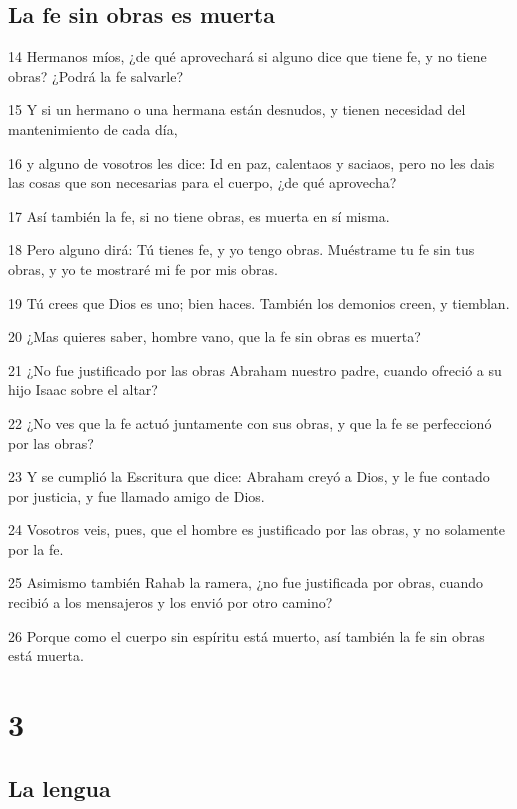 \section*{La fe sin obras es muerta}

\par 14 Hermanos míos, ¿de qué aprovechará si alguno dice que tiene fe, y no tiene obras? ¿Podrá la fe salvarle?
\par 15 Y si un hermano o una hermana están desnudos, y tienen necesidad del mantenimiento de cada día,
\par 16 y alguno de vosotros les dice: Id en paz, calentaos y saciaos, pero no les dais las cosas que son necesarias para el cuerpo, ¿de qué aprovecha?
\par 17 Así también la fe, si no tiene obras, es muerta en sí misma.
\par 18 Pero alguno dirá: Tú tienes fe, y yo tengo obras. Muéstrame tu fe sin tus obras, y yo te mostraré mi fe por mis obras.
\par 19 Tú crees que Dios es uno; bien haces. También los demonios creen, y tiemblan.
\par 20 ¿Mas quieres saber, hombre vano, que la fe sin obras es muerta?
\par 21 ¿No fue justificado por las obras Abraham nuestro padre, cuando ofreció a su hijo Isaac sobre el altar?
\par 22 ¿No ves que la fe actuó juntamente con sus obras, y que la fe se perfeccionó por las obras?
\par 23 Y se cumplió la Escritura que dice: Abraham creyó a Dios, y le fue contado por justicia, y fue llamado amigo de Dios.
\par 24 Vosotros veis, pues, que el hombre es justificado por las obras, y no solamente por la fe.
\par 25 Asimismo también Rahab la ramera, ¿no fue justificada por obras, cuando recibió a los mensajeros y los envió por otro camino?
\par 26 Porque como el cuerpo sin espíritu está muerto, así también la fe sin obras está muerta.

\chapter{3}

\section*{La lengua}

